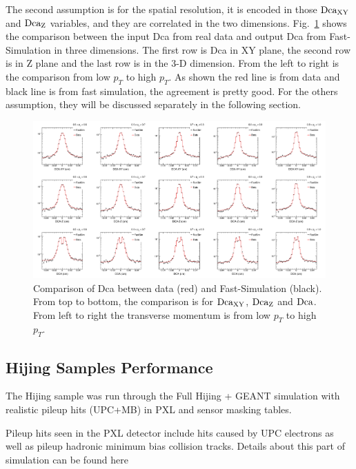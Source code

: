 The second assumption is for the spatial resolution, it is encoded in those $\textup{Dca}_{\textup{XY}}$ and $\textup{Dca}_{\textup{Z}}$ variables, and they are correlated in the two dimensions. Fig.~\ref{assumption2} shows the comparison between the input Dca from real data and output Dca from Fast-Simulation in three dimensions. The first row is Dca in XY plane, the second row is in Z plane and the last row is in the 3-D dimension. From the left to right is the comparison from low $p_{T}$ to high $p_{T}$. As shown the red line is from data and black line is from fast simulation, the agreement is pretty good.
For the others assumption, they will be discussed separately in the following section.

\begin{figure}[htbp]
\centering
\includegraphics[keepaspectratio,width=1.0\textwidth]{figure/Run14_D0HFT/assumption2.png}
\caption{Comparison of Dca between data (red) and Fast-Simulation (black). From top to bottom, the comparison is for $\textup{Dca}_{\textup{XY}}$, $\textup{Dca}_{\textup{Z}}$ and $\textup{Dca}$. From left to right the transverse momentum is from low $p_T$ to high $p_T$.}
\label{assumption2}
\end{figure}

\subsection{Hijing Samples Performance}
\label{hijingsample}

The Hijing sample was run through the Full Hijing + GEANT simulation with realistic pileup hits (UPC+MB) in PXL and sensor masking tables. 

Pileup hits seen in the PXL detector include hits caused by UPC electrons as well as pileup hadronic minimum bias collision tracks. Details about this part of simulation can be found here


